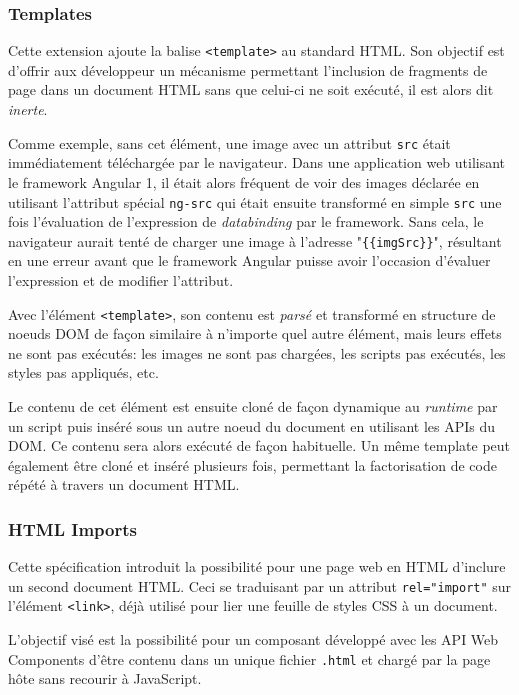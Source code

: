 \subsubsection{Templates}

Cette extension ajoute la balise \texttt{<template>} au standard HTML. Son objectif est d'offrir aux développeur un mécanisme permettant l'inclusion de fragments de page dans un document HTML sans que celui-ci ne soit exécuté, il est alors dit \emph{inerte}.

Comme exemple, sans cet élément, une image avec un attribut \texttt{src} était immédiatement téléchargée par le navigateur. Dans une application web utilisant le framework Angular 1, il était alors fréquent de voir des images déclarée en utilisant l'attribut spécial \texttt{ng-src} qui était ensuite transformé en simple \texttt{src} une fois l'évaluation de l'expression de \emph{databinding} par le framework. Sans cela, le navigateur aurait tenté de charger une image à l'adresse "\texttt{\{\{imgSrc\}\}}", résultant en une erreur avant que le framework Angular puisse avoir l'occasion d'évaluer l'expression et de modifier l'attribut.

Avec l'élément \texttt{<template>}, son contenu est \emph{parsé} et transformé en structure de noeuds DOM de façon similaire à n'importe quel autre élément, mais leurs effets ne sont pas exécutés: les images ne sont pas chargées, les scripts pas exécutés, les styles pas appliqués, etc.

Le contenu de cet élément est ensuite cloné de façon dynamique au \emph{runtime} par un script puis inséré sous un autre noeud du document en utilisant les APIs du DOM. Ce contenu sera alors exécuté de façon habituelle. Un même template peut également être cloné et inséré plusieurs fois, permettant la factorisation de code répété à travers un document HTML.

\subsubsection{HTML Imports}

Cette spécification introduit la possibilité pour une page web en HTML d'inclure un second document HTML. Ceci se traduisant par un attribut \texttt{rel="import"} sur l'élément \texttt{<link>}, déjà utilisé pour lier une feuille de styles CSS à un document.

L'objectif visé est la possibilité pour un composant développé avec les API Web Components d'être contenu dans un unique fichier \texttt{.html} et chargé par la page hôte sans recourir à JavaScript.

